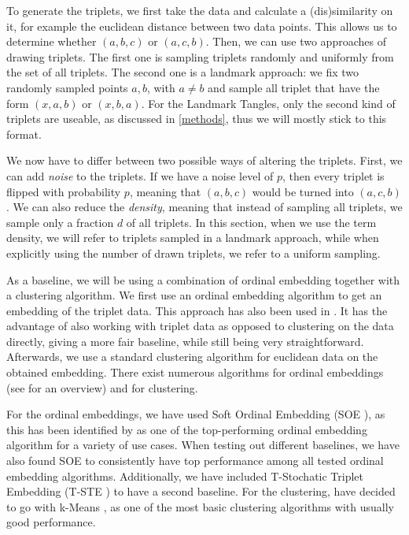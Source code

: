 To generate the triplets, we first take the data and calculate a (dis)similarity on it, for example the euclidean distance between two data points. This allows
us to determine whether $(a,b,c)$ or $(a,c,b)$.
Then, we can use two approaches of drawing triplets. The first one is sampling triplets randomly and uniformly from the set of all triplets. The second one is a landmark approach:
we fix two randomly sampled points $a,b$, with $a \neq b$ and sample all triplet that have the form $(x,a,b)$ or $(x,b,a)$.  For the Landmark Tangles, only the 
second kind of triplets are useable, as discussed in \autoref{methods}, thus we will mostly stick to this format. 

We now have to differ between two possible ways of altering the triplets. First, we can add \textit{noise}
to the triplets. If we have a noise level of $p$, then every triplet is flipped with probability $p$, meaning that $(a,b,c)$ would be turned into $(a,c,b)$. We can also reduce
the \textit{density}, meaning that instead of sampling all triplets, we sample only a fraction $d$ of all triplets. In this section, when we use the term density, we
will refer to triplets sampled in a landmark approach, while when explicitly using the number of drawn triplets, we refer to a uniform sampling.

As a baseline, we will be using a combination of ordinal embedding together with a clustering algorithm. 
We first use an ordinal embedding algorithm to get an embedding of the triplet data. This approach has also been used in \cite{kleindessnerLensDepthFunction2017}. 
It has the advantage of also working with triplet data as opposed to clustering on the data directly, giving a more fair baseline, while still being very straightforward.
Afterwards, we use a standard clustering algorithm for euclidean data on the obtained embedding.  
There exist numerous algorithms for ordinal embeddings (see \cite{vankadaraInsightsOrdinalEmbedding2021} for an overview) and for clustering.

For the ordinal embeddings, we have used Soft Ordinal Embedding (SOE \cite{teradaLocalOrdinalEmbedding2014}), as this has been identified by \cite{vankadaraInsightsOrdinalEmbedding2021} as one of the 
top-performing ordinal embedding algorithm for a variety of use cases. When testing out different baselines, we have also found SOE to consistently have top performance among 
all tested ordinal embedding algorithms. Additionally, we have included T-Stochatic Triplet Embedding (T-STE \cite{laurensvandermaatenStochasticTripletEmbedding2012}) 
to have a second baseline. For the clustering, have decided to go with k-Means \citep{lloydLeastSquaresQuantization1982}, as one of the most basic clustering algorithms with usually good performance.

